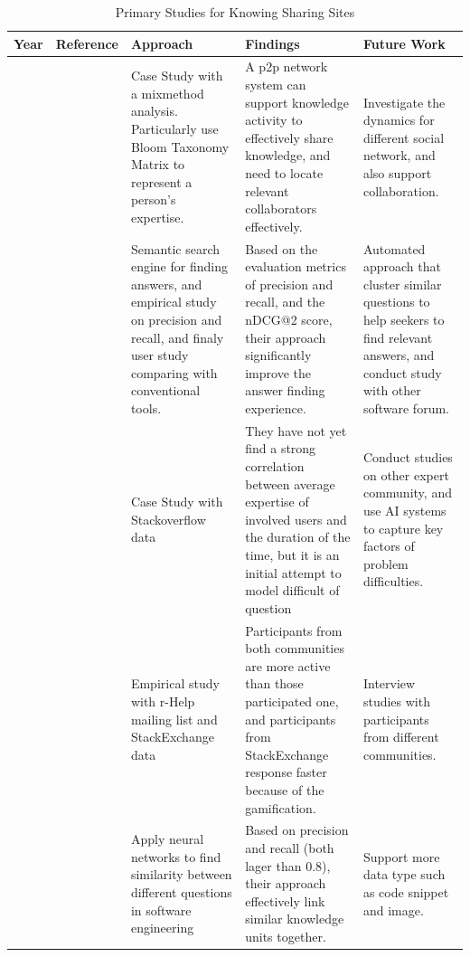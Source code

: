 \begin{table}[htbp]
\centering
\footnotesize
\settowidth{}
\begin{tabulary}{\textwidth}{LLLLL}
\hline
\textbf{Year}           & \textbf{Reference}          & \textbf{Approach}     &\textbf{Findings}  & \textbf{Future Work}\\ \hline
\citeyear{yang2008social} & \citeauthor{yang2008social}\cite{yang2008social} & Case Study with a mixmethod analysis. Particularly use Bloom Taxonomy Matrix to represent a person's expertise. & A p2p network system can support knowledge activity to effectively share knowledge, and need to locate relevant collaborators effectively. & Investigate the dynamics for different social network, and also support collaboration. \\\hline
\citeyear{gottipati2011finding} & \citeauthor{gottipati2011finding}\cite{gottipati2011finding} & Semantic search engine for finding answers, and empirical study on precision and recall, and finaly user study comparing with conventional tools. & Based on the evaluation metrics of precision and recall, and the nDCG@2 score, their approach significantly improve the answer finding experience. & Automated approach that cluster similar questions to help seekers to find relevant answers, and conduct study with other software forum.\\\hline

\citeyear{hanrahan2012modeling} & \citeauthor{hanrahan2012modeling}\cite{hanrahan2012modeling} & Case Study with Stackoverflow data & They have not yet find a strong correlation between average expertise of involved users and the duration of the time, but it is an initial attempt to model difficult of question & Conduct studies on other expert community, and use AI systems to capture key factors of problem difficulties.\\\hline

\citeyear{vasilescu2014social} & \citeauthor{vasilescu2014social}\cite{vasilescu2014social} & Empirical study with r-Help mailing list and StackExchange data & Participants from both communities are more active than those participated one, and participants from StackExchange response faster because of the gamification. & Interview studies with participants from different communities. \\\hline

\citeyear{xu2016predicting} & \citeauthor{xu2016predicting}\cite{xu2016predicting} & Apply neural networks to find similarity between different questions in software engineering & Based on precision and recall (both lager than 0.8), their approach effectively link similar knowledge units together. & Support more data type such as code snippet and image. \\
 \hline
\end{tabulary}
\caption{Primary Studies for Knowing Sharing Sites}
\label{tab:knowledgeSharing}
\end{table}

